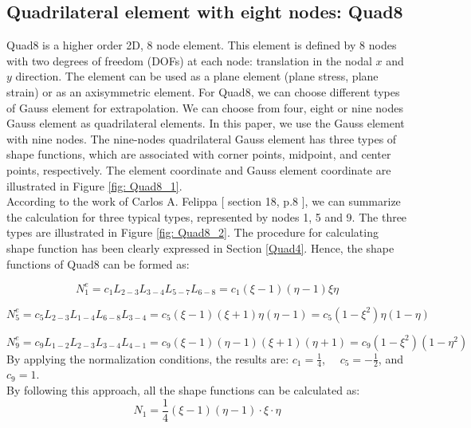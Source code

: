 \subsection{Quadrilateral element with eight nodes: Quad8}
Quad8 is a higher order 2D, 8 node element. This element is defined by 8 nodes with two degrees of freedom (DOFs) at each node: translation in the nodal $x$ and $y$ direction. The element can be used as a plane element (plane stress, plane strain) or as an axisymmetric element. For Quad8, we can choose different types of Gauss element for extrapolation. We can choose from four, eight or nine nodes Gauss element as quadrilateral elements. In this paper, we use the Gauss element with nine nodes. The nine-nodes quadrilateral Gauss element has three types of shape functions, which are associated with corner points, midpoint, and center points, respectively. The element coordinate and Gauss element coordinate are illustrated in Figure \ref{fig: Quad8_1}. \\
According to the work of Carlos A. Felippa [\cite{Felippa} section 18, p.8 ], we can summarize the calculation for three typical types, represented by nodes 1, 5 and 9. The three types are illustrated in Figure \ref{fig: Quad8_2}. The procedure for calculating shape function has been clearly expressed in Section \ref{Quad4}. Hence, the shape functions of Quad8 can be formed as:

\begin{equation} \label{eq: Quad8_1}
N_1^e = c_1 L_{2-3}L_{3-4}L_{5-7} L_{6-8} = c_1 \left(\xi - 1\right) \left(\eta -1\right) \xi \eta
\end{equation}

\begin{equation} \label{eq: Quad8_2}
N_5^e = c_5L_{2-3} L_{1-4} L_{6-8} L_{3-4} = c_5 \left(\xi -1 \right) \left( \xi +1\right) \eta \left( \eta -1\right) = c_5 \left(1-\xi^2\right) \eta \left(1 - \eta\right)
\end{equation}

\begin{equation} \label{eq: Quad8_3}
N_9^e = c_9L_{1-2} L_{2-3} L_{3-4} L_{4-1} = c_9 \left(\xi -1 \right) \left( \eta - 1\right) \left(\xi + 1\right) \left( \eta + 1\right) = c_9 \left(1-\xi^2\right) \left(1 - \eta^2\right)
\end{equation}
By applying the normalization conditions, the results are:
$c_1 = \frac{1}{4}$, $\quad c_5 = -\frac{1}{2}$,  and $c_9 = 1$. \\
By following this approach, all the shape functions can be calculated as:
\begin{equation}
N_1 = \frac{1}{4} \left(\xi - 1\right) \left( \eta -1 \right) \cdot\xi \cdot\eta
\end{equation}

